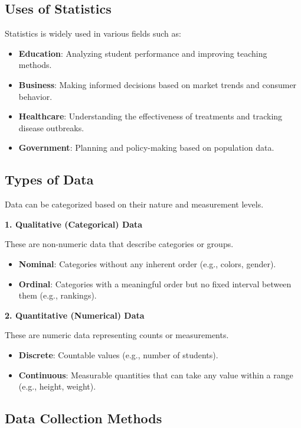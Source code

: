\documentclass[twoside]{book}
\begin{document}
\subsection{Uses of Statistics}

Statistics is widely used in various fields such as:

\begin{itemize}
    \item \textbf{Education}: Analyzing student performance and improving teaching methods.
    \item \textbf{Business}: Making informed decisions based on market trends and consumer behavior.
    \item \textbf{Healthcare}: Understanding the effectiveness of treatments and tracking disease outbreaks.
    \item \textbf{Government}: Planning and policy-making based on population data.
\end{itemize}

\subsection{Types of Data}

Data can be categorized based on their nature and measurement levels.

\textbf{1. Qualitative (Categorical) Data}

These are non-numeric data that describe categories or groups.

\begin{itemize}
    \item \textbf{Nominal}: Categories without any inherent order (e.g., colors, gender).
    \item \textbf{Ordinal}: Categories with a meaningful order but no fixed interval between them (e.g., rankings).
\end{itemize}

\textbf{2. Quantitative (Numerical) Data}

These are numeric data representing counts or measurements.

\begin{itemize}
    \item \textbf{Discrete}: Countable values (e.g., number of students).
    \item \textbf{Continuous}: Measurable quantities that can take any value within a range (e.g., height, weight).
\end{itemize}

\subsection{Data Collection Methods}
\end{document}
